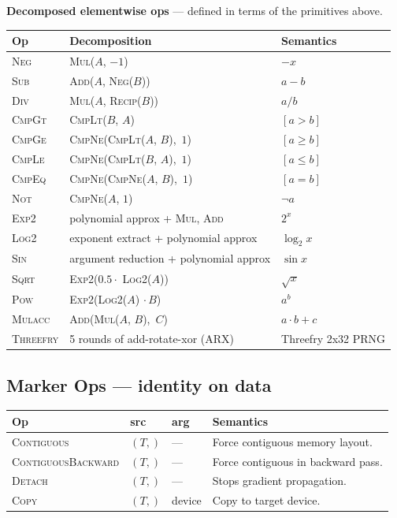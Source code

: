 \documentclass[10pt,letterpaper]{article}
\newcommand{\op}[1]{\textsc{#1}}
\begin{document}
\medskip
\textbf{Decomposed elementwise ops} --- defined in terms of the primitives above.

\smallskip
\begin{tabular}{@{}l l l@{}}
\toprule
\textbf{Op} & \textbf{Decomposition} & \textbf{Semantics} \\
\midrule
\op{Neg} & \op{Mul}($A$, $-1$) & $-x$ \\
\op{Sub} & \op{Add}($A$, \op{Neg}($B$)) & $a - b$ \\
\op{Div} & \op{Mul}($A$, \op{Recip}($B$)) & $a / b$ \\
\op{CmpGt} & \op{CmpLt}($B$, $A$) & $[a > b]$ \\
\op{CmpGe} & \op{CmpNe}(\op{CmpLt}($A$, $B$),\, $1$) & $[a \ge b]$ \\
\op{CmpLe} & \op{CmpNe}(\op{CmpLt}($B$, $A$),\, $1$) & $[a \le b]$ \\
\op{CmpEq} & \op{CmpNe}(\op{CmpNe}($A$, $B$),\, $1$) & $[a = b]$ \\
\op{Not} & \op{CmpNe}($A$, $1$) & $\lnot a$ \\[4pt]
\op{Exp2} & polynomial approx + \op{Mul}, \op{Add} & $2^x$ \\
\op{Log2} & exponent extract + polynomial approx & $\log_2 x$ \\
\op{Sin} & argument reduction + polynomial approx & $\sin x$ \\
\op{Sqrt} & \op{Exp2}($0.5 \cdot$ \op{Log2}($A$)) & $\sqrt{x}$ \\
\op{Pow} & \op{Exp2}(\op{Log2}($A$) $\cdot\, B$) & $a^b$ \\
\op{Mulacc} & \op{Add}(\op{Mul}($A$, $B$),\, $C$) & $a \cdot b + c$ \\
\op{Threefry} & 5 rounds of add-rotate-xor (ARX) & Threefry 2x32 PRNG \\
\bottomrule
\end{tabular}

\subsection*{{\color{markerorange}Marker Ops} \normalfont\small--- identity on data}

\begin{tabular}{@{}l l l l@{}}
\toprule
\textbf{Op} & \textbf{src} & \textbf{arg} & \textbf{Semantics} \\
\midrule
\op{Contiguous} & $(T,)$ & --- & Force contiguous memory layout. \\
\op{ContiguousBackward} & $(T,)$ & --- & Force contiguous in backward pass. \\
\op{Detach} & $(T,)$ & --- & Stops gradient propagation. \\
\op{Copy} & $(T,)$ & device & Copy to target device. \\
\bottomrule
\end{tabular}
\end{document}
